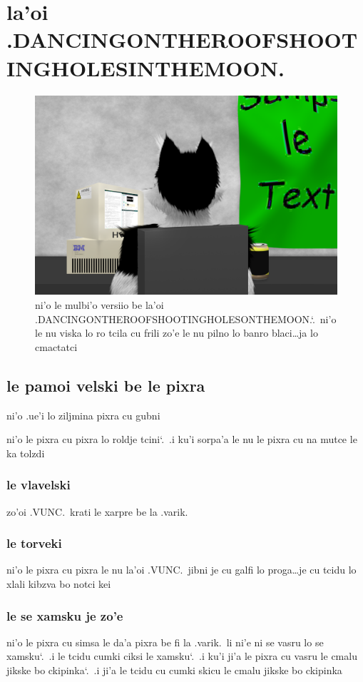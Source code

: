 \documentclass{report}
\newcommand\sds{\spacefactor\sfcode`.\ \space}
\begin{document}
\chapter{la'oi .DANCINGONTHEROOFSHOOTINGHOLESINTHEMOON.}
\begin{figure}[ht]
	\centering
	\includegraphics[width=\textwidth]{dancingontheroofshootingholesinthemoon/dancingontheroofshootingholesinthemoon.png}
	\caption[center]{ni'o le mulbi'o versiio be la'oi .DANCINGONTHEROOFSHOOTINGHOLESONTHEMOON.\sds  ni'o le nu viska lo ro tcila cu frili zo'e le nu pilno lo banro blaci\ldots ja lo cmactatci}
\end{figure}
\section{le pamoi velski be le pixra}
ni'o .ue'i lo ziljmina pixra cu gubni

ni'o le pixra cu pixra lo roldje tcini\sds  .i ku'i sorpa'a le nu le pixra cu na mutce le ka tolzdi

\subsection{le vlavelski}
zo'oi .VUNC.\ krati le xarpre be la .varik.
\subsection{le torveki}
ni'o le pixra cu pixra le nu la'oi .VUNC.\ jibni je cu galfi lo proga\ldots je cu tcidu lo xlali kibzva bo notci kei

\subsection{le se xamsku je zo'e}
ni'o le pixra cu simsa le da'a pixra be fi la .varik.\ li ni'e ni se vasru lo se xamsku\sds  .i le tcidu cumki ciksi le xamsku\sds  .i ku'i ji'a le pixra cu vasru le cmalu jikske bo ckipinka\sds  .i ji'a le tcidu cu cumki skicu le cmalu jikske bo ckipinka
\end{document}
